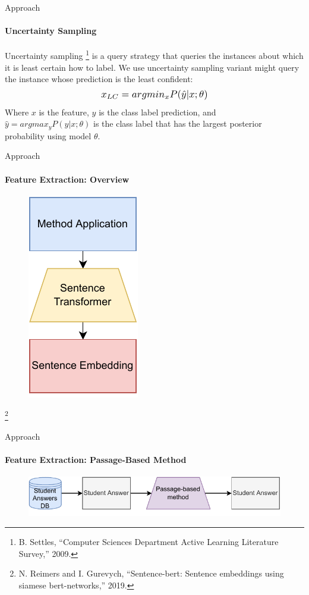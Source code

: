 \documentclass[aspectratio=169]{beamer}
\begin{document}
\begin{frame}{Approach}
\framesubtitle{Uncertainty Sampling}
Uncertainty sampling \footnote{\footnotesize\tiny B. Settles, “Computer Sciences Department Active Learning Literature Survey,” 2009.} is a query strategy that queries the instances about which it is least certain how to label. We use uncertainty sampling variant might query the instance whose prediction is the least confident:
\begin{equation}
\label{equation:uncertainty sampling}
\scalebox{1.2}{$x_{LC} = argmin_{x} P({\hat{y}|x;\theta})$}
\end{equation}
Where $x$ is the feature, $y$ is the class label prediction, and $\hat{y} = argmax_y P({y|x;\theta})$ is the class label that has the largest posterior probability using model $\theta$.
\end{frame}
\begin{frame}{Approach}
\framesubtitle{Feature Extraction: Overview}
\begin{figure}
	\centering
	\includegraphics[scale = 0.65]{images/feature_extraction.pdf}
	\label{fig:feature extraction}
\end{figure}
\footnote{\footnotesize\tiny N. Reimers and I. Gurevych, “Sentence-bert: Sentence embeddings using siamese bert-networks,”
	2019.}
\end{frame}
\begin{frame}{Approach}
\framesubtitle{Feature Extraction: Passage-Based Method}
\begin{figure}
	\centering
	\includegraphics[scale = 1]{images/passage_FE_slides.pdf}
	\label{fig:passage fe slides}
\end{figure}
\end{frame}
\end{document}
